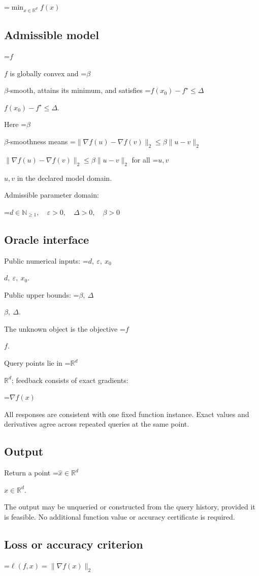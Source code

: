 \documentclass[10pt,a4paper]{article}
\newcommand{\AtlasMath}[1]{\par\begingroup\centering\setbox0=\hbox{$\displaystyle #1$}\ifdim\wd0>1.4\linewidth\typeout{ATLAS WIDE FORMULA: \the\wd0}\fi\ifdim\wd0>\linewidth\resizebox{\linewidth}{!}{\box0}\else\box0\fi\par\endgroup}
\newcommand{\AtlasInlineMath}[1]{\begingroup\setbox0=\hbox{$#1$}\ifdim\wd0>.4\linewidth\endgroup\AtlasMath{#1}\else\endgroup$#1$\fi}
\begin{document}
\AtlasMath{\min_{x\in \mathbb{R}^d}f(x)}


\subsection{Admissible model}
\AtlasInlineMath{f} is globally convex and \AtlasInlineMath{\beta}-smooth, attains its minimum, and satisfies \AtlasInlineMath{f(x_0)-f^\star\le\Delta}.

Here \AtlasInlineMath{\beta}-smoothness means \AtlasInlineMath{\|\nabla f(u)-\nabla f(v)\|_2\le\beta\|u-v\|_2} for all \AtlasInlineMath{u,v} in the declared model domain.

Admissible parameter domain:


\AtlasMath{d\in\mathbb{N}_{\ge1},\quad \varepsilon>0,\quad \Delta>0,\quad \beta>0}


\subsection{Oracle interface}
Public numerical inputs: \AtlasInlineMath{d,\ \varepsilon,\ x_0}.

Public upper bounds: \AtlasInlineMath{\beta,\ \Delta}.

The unknown object is the objective \AtlasInlineMath{f}.

Query points lie in \AtlasInlineMath{\mathbb{R}^d}; feedback consists of exact gradients:


\AtlasMath{\nabla f(x)}


All responses are consistent with one fixed function instance. Exact values and derivatives agree across repeated queries at the same point.

\subsection{Output}
Return a point \AtlasInlineMath{\widehat x\in\mathbb R^d}.

The output may be unqueried or constructed from the query history, provided it is feasible. No additional function value or accuracy certificate is required.

\subsection{Loss or accuracy criterion}

\AtlasMath{\ell(f,x)=\|\nabla f(x)\|_2}
\end{document}
